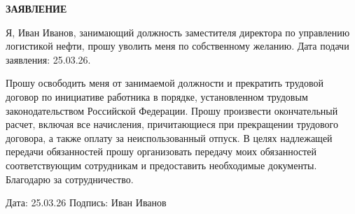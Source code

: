 \documentclass[12pt]{article}
\begin{document}
\begin{center}
\textbf{\LARGE ЗАЯВЛЕНИЕ}
\end{center}

\vspace{1cm}

Я, Иван Иванов, занимающий должность заместителя директора по управлению логистикой нефти, прошу уволить меня по собственному желанию. Дата подачи заявления: 25.03.26.

Прошу освободить меня от занимаемой должности и прекратить трудовой договор по инициативе работника в порядке, установленном трудовым законодательством Российской Федерации. Прошу произвести окончательный расчет, включая все начисления, причитающиеся при прекращении трудового договора, а также оплату за неиспользованный отпуск. В целях надлежащей передачи обязанностей прошу организовать передачу моих обязанностей соответствующим сотрудникам и предоставить необходимые документы. Благодарю за сотрудничество.

\vfill

\noindent
Дата: 25.03.26 \hfill Подпись: Иван Иванов
\end{document}
